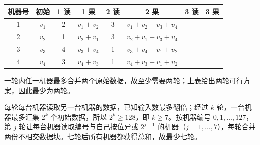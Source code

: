 \begin{answer}
\begin{center}
\begingroup\setlength{\tabcolsep}{4pt}
\begin{tabular}{cccccccc}
\toprule
机器号 & 初始 & 1 读 & 1 果 & 2 读 & 2 果 & 3 读 & 3 果 \\
\midrule
1 & \(v_1\) & 2 & \(v_1+v_2\) & 3 & \(v_1+v_2+v_3+v_4\) &  &  \\
2 & \(v_2\) & 1 & \(v_2+v_1\) & 3 & \(v_2+v_1+v_3+v_4\) &  &  \\
3 & \(v_3\) & 4 & \(v_3+v_4\) & 1 & \(v_3+v_4+v_1+v_2\) &  &  \\
4 & \(v_4\) & 3 & \(v_4+v_3\) & 1 & \(v_4+v_3+v_1+v_2\) &  &  \\
\bottomrule
\end{tabular}
\endgroup
\end{center}

一轮内任一机器最多合并两个原始数据，故至少需要两轮；上表给出两轮可行方案，因此最少为两轮。


每轮每台机器读取另一台机器的数据，已知输入数最多翻倍；经过 \(k\) 轮，一台机器最多汇集 \(2^k\) 个初始数据，所以 \(2^k\geqslant128\)，即 \(k\geqslant7\)。按机器编号 \(0,1,\ldots,127\)，第 \(j\) 轮让每台机器读取编号与自己按位异或 \(2^{j-1}\) 的机器（\(j=1,\ldots,7\)），每轮合并两份不相交数据块。七轮后所有机器都获得总和，故最少七轮。



\end{answer}
